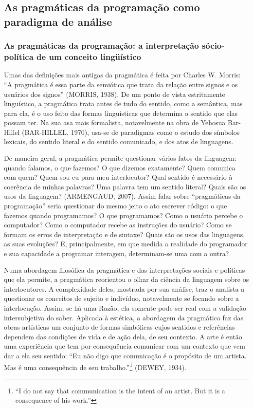 \subsection{As pragmáticas da programação como paradigma de análise} \label{2.3.2}

\subsubsection{As pragmáticas da programação: a interpretação sócio-política de um conceito lingüístico} \label{2.3.2.a}

Umas das definições mais antigas da pragmática é feita por Charles W. Morris: “A pragmática é essa parte da semiótica que trata da relação entre signos e os usuários dos signos” (MORRIS, 1938). De um ponto de vista estritamente linguístico, a pragmática trata antes de tudo do sentido, como a semântica, mas para ela, é o uso feito das formas linguísticas que determina o sentido que elas possam ter. Na sua asa mais formalista, notavelmente na obra de Yehosua Bar-Hillel (BAR-HILLEL, 1970), usa-se de paradigmas como o estudo dos símbolos lexicais, do sentido literal e do sentido comunicado, e dos atos de linguagens. 

De maneira geral, a pragmática permite questionar vários fatos da linguagem: quando falamos, o que fazemos? O que dizemos exatamente? Quem comunica com quem? Quem sou eu para meu interlocutor? Qual sentido é necessário à coerência de minhas palavras? Uma palavra tem um sentido literal? Quais são os usos da linguagem? (ARMENGAUD, 2007). Assim falar sobre “pragmáticas da programação” seria questionar do mesmo jeito o ato escrever código: o que fazemos quando programamos? O que programamos? Como o usuário percebe o computador? Como o computador recebe as instruções do usuário? Como se formam os erros de interpretação e de sintaxe? Quais são os usos das linguagens, as suas evoluções? E, principalmente, em que medida a realidade do programador e sua capacidade a programar interagem, determinam-se uma com a outra?

Numa abordagem filosófica da pragmática e das interpretações sociais e políticas que ela permite, a pragmática reorientou o olhar da ciência da linguagem sobre os interlocutores. A complexidade deles, mostrada por sua análise, traz o analista a questionar os conceitos de sujeito e indivíduo, notavelmente se focando sobre a interlocução. Assim, se há uma Razão, ela somente pode ser real com a validação intersubjetiva do saber. Aplicada à estética, a abordagem da pragmática faz das obras artísticas um conjunto de formas simbólicas cujos sentidos e referências dependem das condições de vida e de ação dela, de seu contexto. A arte é então uma experiência que tem por consequência comunicar com um contexto que vem dar a ela seu sentido: “Eu não digo que comunicação é o propósito de um artista. Mas é uma consequência de seu trabalho.”\footnote{“I do not say that communication is the intent of an artist. But it is a consequence of his work.”}  (DEWEY, 1934). 

